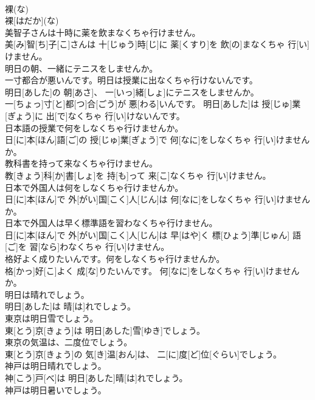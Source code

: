 \documentclass[8pt]{extreport}
\begin{document}
\begin{CJK}{UTF8}{min}
\\	裸(な)	
\\	裸[はだか](な)	
\\	美智子さんは十時に薬を飲まなくちゃ行けません。	
\\	美[み]智[ち]子[こ]さんは 十[じゅう]時[じ]に 薬[くすり]を 飲[の]まなくちゃ 行[い]けません。
\\	明日の朝、一緒にテニスをしませんか。 
\\	一寸都合が悪いんです。明日は授業に出なくちゃ行けないんです。	
\\	明日[あした]の 朝[あさ]、 一[いっ]緒[しょ]にテニスをしませんか。 
\\	一[ちょっ]寸[と]都[つ]合[ごう]が 悪[わる]いんです。 明日[あした]は 授[じゅ]業[ぎょう]に 出[で]なくちゃ 行[い]けないんです。
\\	日本語の授業で何をしなくちゃ行けませんか。	
\\	日[に]本[ほん]語[ご]の 授[じゅ]業[ぎょう]で 何[なに]をしなくちゃ 行[い]けませんか。
\\	教科書を持って来なくちゃ行けません。	
\\	教[きょう]科[か]書[しょ]を 持[も]って 来[こ]なくちゃ 行[い]けません。
\\	日本で外国人は何をしなくちゃ行けませんか。	
\\	日[に]本[ほん]で 外[がい]国[こく]人[じん]は 何[なに]をしなくちゃ 行[い]けませんか。
\\	日本で外国人は早く標準語を習わなくちゃ行けません。	
\\	日[に]本[ほん]で 外[がい]国[こく]人[じん]は 早[はや]く 標[ひょう]準[じゅん] 語[ご]を 習[なら]わなくちゃ 行[い]けません。
\\	格好よく成りたいんです。何をしなくちゃ行けませんか。	
\\	格[かっ]好[こ]よく 成[な]りたいんです。 何[なに]をしなくちゃ 行[い]けませんか。
\\	明日は晴れでしょう。	
\\	明日[あした]は 晴[は]れでしょう。
\\	東京は明日雪でしょう。	
\\	東[とう]京[きょう]は 明日[あした]雪[ゆき]でしょう。
\\	東京の気温は、二度位でしょう。	
\\	東[とう]京[きょう]の 気[き]温[おん]は、 二[に]度[ど]位[ぐらい]でしょう。
\\	神戸は明日晴れでしょう。	
\\	神[こう]戸[べ]は 明日[あした]晴[は]れでしょう。
\\	神戸は明日暑いでしょう。	

\end{CJK}
\end{document}
